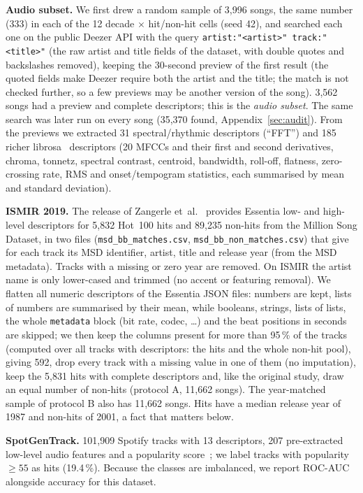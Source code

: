 \textbf{Audio subset.} We first drew a random sample of 3{,}996 songs, the same number (333) in each of
the 12 decade $\times$ hit/non-hit cells (seed 42), and searched each one on the public Deezer API with the
query \texttt{artist:"<artist>" track:"<title>"} (the raw artist and title fields of the dataset, with double quotes
and backslashes removed), keeping the 30-second preview of the first result (the
quoted fields make Deezer require both the artist and the title; the match is not checked further, so a few
previews may be another version of the song). 3{,}562 songs
had a preview and complete descriptors; this is the \emph{audio subset}. The same search was later run on every
song (35{,}370 found, Appendix~\ref{sec:audit}). From the previews we extracted 31 spectral/rhythmic descriptors (``FFT'') and 185 richer
librosa~\cite{mcfee2015librosa} descriptors (20 MFCCs and their first and second
derivatives, chroma, tonnetz, spectral contrast, centroid, bandwidth, roll-off, flatness,
zero-crossing rate, RMS and onset/tempogram statistics, each summarised by mean and
standard deviation).

\textbf{ISMIR 2019.} The release of Zangerle et~al.~\cite{zangerle2019hit} provides
Essentia low- and high-level descriptors for 5{,}832 Hot~100 hits and 89{,}235 non-hits
from the Million Song Dataset, in two files (\texttt{msd\_bb\_matches.csv}, \texttt{msd\_bb\_non\_matches.csv}) that
give for each track its MSD identifier, artist, title and release year (from the MSD metadata). Tracks with a
missing or zero year are removed. On ISMIR the artist name is only lower-cased and trimmed (no accent or
featuring removal). We flatten all numeric descriptors of the Essentia JSON files: numbers are kept, lists of
numbers are summarised by their mean, while booleans, strings, lists of lists, the whole \texttt{metadata} block
(bit rate, codec, \dots) and the beat positions in seconds are skipped; we then keep the columns present for more
than 95\,\% of the tracks (computed over all tracks with descriptors: the hits and the whole non-hit pool), giving 592, drop every track with a missing value in one of them (no imputation),
keep the 5{,}831 hits with complete
descriptors and, like the original study, draw an equal number of non-hits (protocol A, 11{,}662 songs). The
year-matched sample of protocol B also has 11{,}662 songs. Hits have a median release year of 1987 and non-hits of 2001, a fact that matters
below.

\textbf{SpotGenTrack.} 101{,}909 Spotify tracks with 13 descriptors, 207 pre-extracted
low-level audio features and a popularity score~\cite{martingutierrez2020multimodal}; we
label tracks with popularity $\geq 55$ as hits (19.4\,\%). Because the classes are
imbalanced, we report ROC-AUC alongside accuracy for this dataset.

